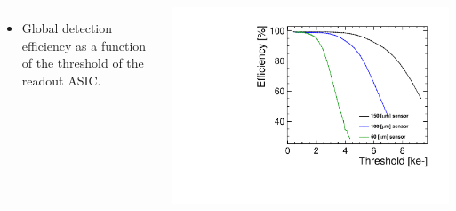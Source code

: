 \begin{frame}
\begin{columns}
    \begin{itemize}
    \item Global detection efficiency as a function of the threshold
      of the readout ASIC.
    \end{itemize}
    \centering
    \includegraphics[width=\textwidth]{../figures/TestBeam/Efficiency_vs_THL.pdf}
  \end{columns}


\end{frame}